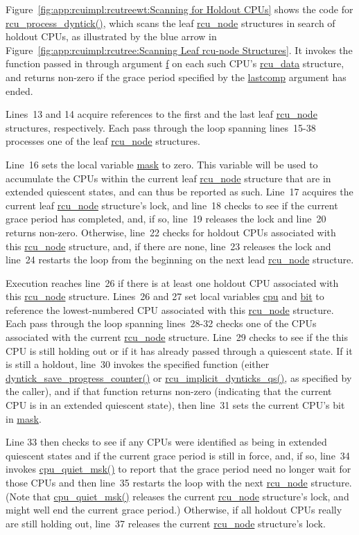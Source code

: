 Figure~\ref{fig:app:rcuimpl:rcutreewt:Scanning for Holdout CPUs}
shows the code for \url{rcu_process_dyntick()}, which scans the
leaf \url{rcu_node} structures in search of holdout CPUs,
as illustrated by the blue arrow in
Figure~\ref{fig:app:rcuimpl:rcutree:Scanning Leaf rcu-node Structures}.
It invokes the function passed in through argument \url{f} on each
such CPU's \url{rcu_data} structure, and returns non-zero if
the grace period specified by the \url{lastcomp} argument has ended.

Lines~13 and 14 acquire references to the first and the last leaf
\url{rcu_node} structures, respectively.
Each pass through the loop spanning lines~15-38 processes one of
the leaf \url{rcu_node} structures.

Line~16 sets the local variable \url{mask} to zero.
This variable will be used to accumulate the CPUs within the current
leaf \url{rcu_node} structure that are in extended quiescent states, and
can thus be reported as such.
Line~17 acquires the current leaf \url{rcu_node} structure's lock,
and line~18 checks to see if the current grace period has completed,
and, if so, line~19 releases the lock and line~20 returns non-zero.
Otherwise, line~22 checks for holdout CPUs associated with this
\url{rcu_node} structure, and, if there are none, line~23 releases
the lock and line~24 restarts the loop from the beginning on the
next lead \url{rcu_node} structure.

Execution reaches line~26 if there is at least one holdout CPU associated
with this \url{rcu_node} structure.
Lines~26 and 27 set local variables \url{cpu} and \url{bit} to reference
the lowest-numbered CPU associated with this \url{rcu_node} structure.
Each pass through the loop spanning lines~28-32 checks one of the
CPUs associated with the current \url{rcu_node} structure.
Line~29 checks to see if the this CPU is still holding out or if
it has already passed through a quiescent state.
If it is still a holdout, line~30 invokes the specified function
(either \url{dyntick_save_progress_counter()} or
\url{rcu_implicit_dynticks_qs()}, as specified by the caller), and
if that function returns non-zero (indicating that the current CPU
is in an extended quiescent state), then line~31 sets the current
CPU's bit in \url{mask}.

Line 33 then checks to see if any CPUs were identified as being
in extended quiescent states and if the current grace period is
still in force, and, if so, line~34 invokes \url{cpu_quiet_msk()}
to report that the grace period need no longer wait for those
CPUs and then line~35 restarts the loop with the next \url{rcu_node}
structure.
(Note that \url{cpu_quiet_msk()} releases the current \url{rcu_node}
structure's lock, and might well end the current grace period.)
Otherwise, if all holdout CPUs really are still holding out, line~37
releases the current \url{rcu_node} structure's lock.

